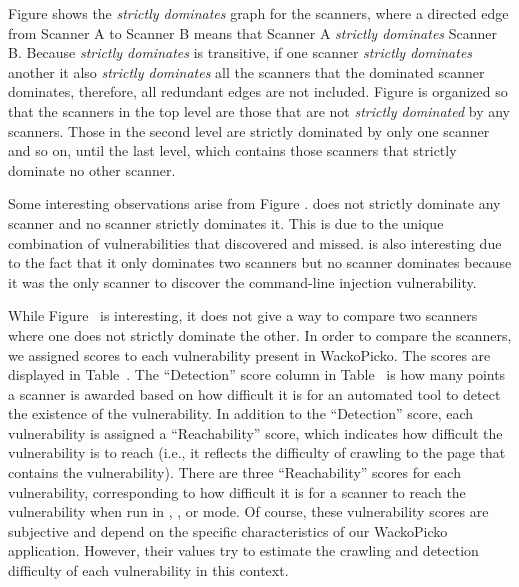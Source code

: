 
Figure  shows the \emph{strictly dominates} graph for the
scanners, where a directed edge from Scanner A to Scanner B means
that Scanner A \emph{strictly dominates} Scanner B. Because \emph{strictly
  dominates} is transitive, if one scanner \emph{strictly dominates} another
it also \emph{strictly dominates} all the scanners that the dominated
scanner dominates, therefore, all redundant edges are not
included. Figure  is organized so that the scanners in
the top level are 
those that are not \emph{strictly dominated} by any scanners. Those in the
second level are strictly dominated by only one scanner and so on, until the
last level, which contains those scanners that strictly dominate no other scanner.

Some interesting observations arise from Figure . \nstalker{}
does not strictly dominate any scanner and no scanner strictly dominates it.
This is due to the unique combination of vulnerabilities that \nstalker{}
discovered and missed.
%
\burp{} is also interesting due to the fact that it only dominates two
scanners but no scanner dominates \burp{} because it was the only
scanner to discover the command-line injection vulnerability. 



While Figure~ is interesting, it does not give a way to compare
two scanners where one does not strictly dominate the other. In order to
compare the scanners, we assigned scores to each vulnerability present in
WackoPicko. The scores are displayed in Table~. The ``Detection''
score column in Table~ is how many points a
scanner is awarded based on how difficult it is for an automated tool to detect the existence of the
vulnerability. In addition to the ``Detection'' score, each
vulnerability is assigned a ``Reachability'' score, which indicates how difficult
the vulnerability is to reach (i.e., it reflects the difficulty of crawling to the page that contains the vulnerability). 
There are three ``Reachability'' scores for
each vulnerability, corresponding to how difficult it is for a scanner to
reach the vulnerability when run in \initial{}, \config{}, or \manual{} mode.
Of course, these vulnerability scores are subjective and depend on the
specific characteristics of our WackoPicko application. However, their
values try to estimate the crawling and detection difficulty of each
vulnerability in this context.

